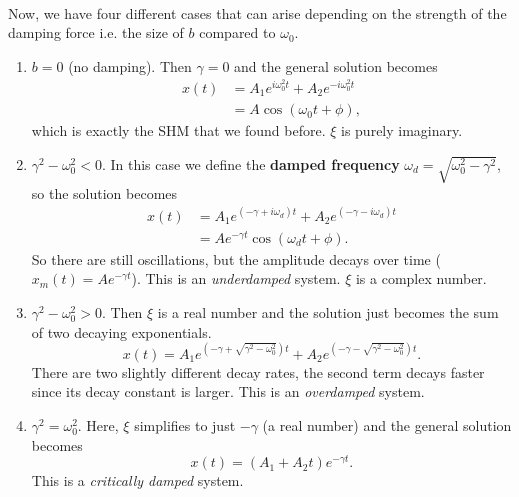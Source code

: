 \documentclass[../classical_mechanics.tex]{subfiles}
\begin{document}
        \paragraph{}
        Now, we have four different cases that can arise depending on the strength of the damping force i.e. the size of $b$ compared to $\omega_0$.
        \begin{enumerate}[label=\textbf{Case \arabic*}:]
            \item $b=0$ (no damping). Then $\gamma=0$ and the general solution becomes
            \begin{align}
                x(t)&=A_1e^{i\omega_0^2t}+A_2e^{-i\omega_0^2t}\\
                &=A\cos(\omega_0 t+\phi),
            \end{align}
            which is exactly the SHM that we found before.
            $\xi$ is purely imaginary.
            \item $\gamma^2-\omega_0^2<0$. In this case we define the \textbf{damped frequency} $\omega_d=\sqrt{\omega_0^2-\gamma^2}$, so the solution becomes
            \begin{align}
                x(t)&=A_1e^{(-\gamma+i\omega_d)t}+A_2e^{(-\gamma-i\omega_d)t}\\
                &=Ae^{-\gamma t}\cos(\omega_d t+\phi).
            \end{align}
            So there are still oscillations, but the amplitude decays over time ($x_m(t)=Ae^{-\gamma t}$).
            This is an \textit{underdamped} system.
            $\xi$ is a complex number.
            \item $\gamma^2-\omega_0^2>0$. Then $\xi$ is a real number and the solution just becomes the sum of two decaying exponentials.
            \begin{equation}
                x(t)=A_1e^{(-\gamma+\sqrt{\gamma^2-\omega_0^2})t}+A_2e^{(-\gamma-\sqrt{\gamma^2-\omega_0^2})t}.
            \end{equation}
            There are two slightly different decay rates, the second term decays faster since its decay constant is larger.
            This is an \textit{overdamped} system.
            \item $\gamma^2=\omega_0^2$. Here, $\xi$ simplifies to just $-\gamma$ (a real number) and the general solution becomes
            \begin{equation}
                x(t)=(A_1+A_2t)e^{-\gamma t}.
            \end{equation}
            This is a \textit{critically damped} system.
        \end{enumerate}
\end{document}
